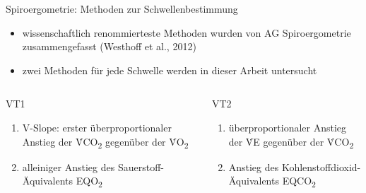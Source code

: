 \documentclass[colorBG,slideColor,9pt]{beamer}
\newcommand{\eqotwo}{EQO\textsubscript{2}}
\newcommand{\eqcotwo}{EQCO\textsubscript{2}}
\newcommand{\votwo}{\.{V}O\textsubscript{2}}
\newcommand{\vcotwo}{\.{V}CO\textsubscript{2}}
\newcommand{\ve}{\.{V}E}
\begin{document}
\begin{frame}{Spiroergometrie: Methoden zur Schwellenbestimmung}
\begin{itemize}
\item wissenschaftlich renommierteste Methoden wurden von AG Spiroergometrie zusammengefasst (Westhoff et al., 2012)
\item zwei Methoden für jede Schwelle werden in dieser Arbeit untersucht
\end{itemize}
\begin{columns}
\begin{column}[t]{5cm}
\begin{block}{VT1}
\begin{enumerate}
\item V-Slope: erster überproportionaler Anstieg der \vcotwo{} gegenüber der \votwo
\item alleiniger Anstieg des Sauerstoff-Äquivalents \eqotwo
\end{enumerate}
\end{block}
\end{column}
\begin{column}[t]{5cm}
\begin{block}{VT2}
\begin{enumerate}
\item überproportionaler Anstieg der \ve{} gegenüber der \vcotwo
\item Anstieg des Kohlenstoffdioxid-Äquivalents \eqcotwo
\end{enumerate}
\end{block}
\end{column}
\end{columns}
\end{frame}
\end{document}

